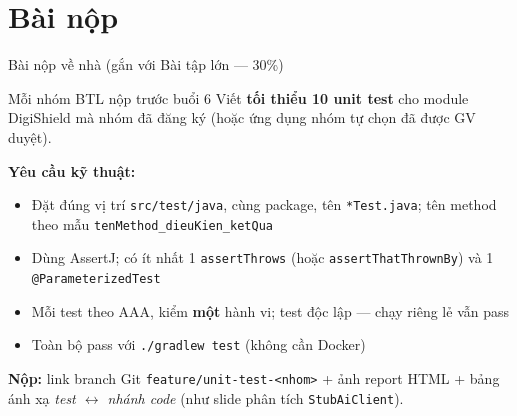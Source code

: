\documentclass[aspectratio=169,12pt]{beamer}
\begin{document}
\section{Bài nộp}

\begin{frame}[shrink=8]{Bài nộp về nhà (gắn với Bài tập lớn --- 30\%)}
  \begin{block}{Mỗi nhóm BTL nộp trước buổi 6}
    Viết \textbf{tối thiểu 10 unit test} cho module DigiShield mà nhóm
    đã đăng ký (hoặc ứng dụng nhóm tự chọn đã được GV duyệt).
  \end{block}

  \vspace{0.3em}
  \textbf{Yêu cầu kỹ thuật:}
  \begin{itemize}
    \item Đặt đúng vị trí \texttt{src/test/java}, cùng package,
          tên \texttt{*Test.java}; tên method theo mẫu
          \texttt{tenMethod\_dieuKien\_ketQua}
    \item Dùng AssertJ; có ít nhất 1 \texttt{assertThrows}
          (hoặc \texttt{assertThatThrownBy}) và 1 \texttt{@ParameterizedTest}
    \item Mỗi test theo AAA, kiểm \textbf{một} hành vi;
          test độc lập --- chạy riêng lẻ vẫn pass
    \item Toàn bộ pass với \texttt{./gradlew test} (không cần Docker)
  \end{itemize}

  \vspace{0.3em}
  \textbf{Nộp:} link branch Git \texttt{feature/unit-test-<nhom>} +
  ảnh report HTML + bảng ánh xạ \textit{test \(\leftrightarrow\) nhánh code}
  (như slide phân tích \texttt{StubAiClient}).
\end{frame}
\end{document}
